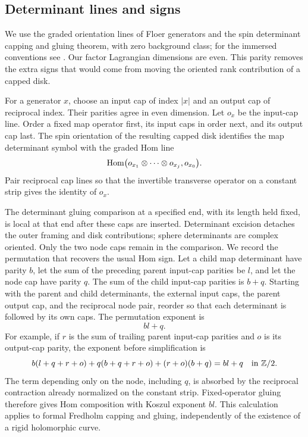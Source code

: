 \subsection{Determinant lines and signs}
\label{comp:orientations}

We use the graded orientation lines of Floer generators and the
spin determinant capping and gluing theorem, with zero background
class; for the immersed conventions see
\cite[Sections~4--5]{AkahoJoyce}.  Our factor Lagrangian dimensions
are even.  This parity removes the extra signs that would come
from moving the oriented rank contribution of a capped disk.

For a generator $x$, choose an input cap of index $|x|$ and an
output cap of reciprocal index.  Their parities agree in even
dimension.  Let $o_x$ be the input-cap line.  Order a fixed map
operator first, its input caps in order next, and its output cap
last.  The spin orientation of the resulting capped disk
identifies the map determinant symbol with the graded Hom line
\[
 \operatorname{Hom}\bigl(o_{x_1}\otimes\cdots\otimes o_{x_j},o_{x_0}\bigr).
\]
Pair reciprocal cap lines so that the invertible transverse
operator on a constant strip gives the identity of $o_x$.

The determinant gluing comparison at a specified end, with its
length held fixed, is local at that end after these caps are
inserted.  Determinant excision detaches the outer framing and
disk contributions; sphere determinants are complex oriented.
Only the two node caps remain in the comparison.  We record the
permutation that recovers the usual Hom sign.  Let a child map
determinant have parity $b$, let the sum of the preceding parent
input-cap parities be $l$, and let the node cap have parity $q$.
The sum of the child input-cap parities is $b+q$.  Starting with
the parent and child determinants, the external input caps, the
parent output cap, and the reciprocal node pair, reorder so that
each determinant is followed by its own caps.  The permutation
exponent is
\[
 bl+q.
\]
For example, if $r$ is the sum of trailing parent input-cap
parities and $o$ is its output-cap parity, the exponent before
simplification is
\[
 b(l+q+r+o)+q(b+q+r+o)+(r+o)(b+q)=bl+q
 \quad\text{in }\mathbb Z/2.
\]
The term depending only on the node, including $q$, is absorbed by
the reciprocal contraction already normalized on the constant
strip.  Fixed-operator gluing therefore gives Hom composition
with Koszul exponent $bl$.  This calculation applies to formal
Fredholm capping and gluing, independently of the existence of a
rigid holomorphic curve.

